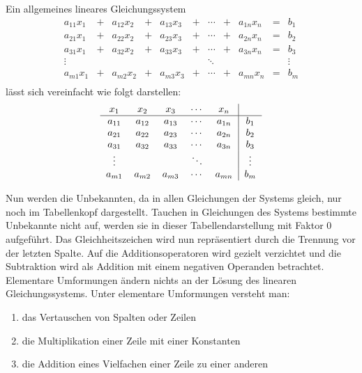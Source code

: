 			Ein allgemeines lineares Gleichungssystem
			\[
				\begin{array} {ccccccccccc}
					a_{11} x_1 & + & a_{12} x_2 & + & a_{13} x_3 & + & \cdots & + & a_{1n} x_n & = & b_1\\
					a_{21} x_1 & + & a_{22} x_2 & + & a_{23} x_3 & + & \cdots & + & a_{2n} x_n & = & b_2\\
					a_{31} x_1 & + & a_{32} x_2 & + & a_{33} x_3 & + & \cdots & + & a_{3n} x_n & = & b_3\\
					\vdots & & & & & & \ddots & & & & \vdots\\
					a_{m1} x_1 & + & a_{m2} x_2 & + & a_{m3} x_3 & + & \cdots & + & a_{mn} x_n & = & b_m\\
				\end{array}
			\]
			l\"asst sich vereinfacht wie folgt darstellen:
			\[
				\begin{tabular} {ccccc|c}
					$x_1$ & $x_2$ & $x_3$ & $\cdots$ & $x_n$ &\\
					\hline
					$a_{11}$ & $a_{12}$ & $a_{13}$ & $\cdots$ & $a_{1n}$ & $b_1$\\
					$a_{21}$ & $a_{22}$ & $a_{23}$ & $\cdots$ & $a_{2n}$ & $b_2$\\
					$a_{31}$ & $a_{32}$ & $a_{33}$ & $\cdots$ & $a_{3n}$ & $b_3$\\
					$\vdots$ & & & $\ddots$ & & $\vdots$\\
					$a_{m1}$ & $a_{m2}$ & $a_{m3}$ & $\cdots$ & $a_{mn}$ & $b_m$\\
				\end{tabular}
			\]
			
			\noindent Nun werden die Unbekannten,
			da in allen Gleichungen der Systems gleich,
			nur noch im Tabellenkopf dargestellt.
			Tauchen in Gleichungen des Systems bestimmte Unbekannte nicht auf,
			werden sie in dieser Tabellendarstellung mit Faktor 0 aufgef\"uhrt.
			Das Gleichheitszeichen wird nun repr\"asentiert durch die Trennung vor der letzten Spalte.
			Auf die Additionsoperatoren wird gezielt verzichtet und die Subtraktion wird als Addition mit einem negativen   	Operanden betrachtet.
            Elementare Umformungen \"andern nichts an der L\"osung des linearen Gleichungssystems.
			Unter elementare Umformungen versteht man:

			\begin{enumerate}
				\item das Vertauschen von Spalten oder Zeilen
				\item die Multiplikation einer Zeile mit einer Konstanten
				\item die Addition eines Vielfachen einer Zeile zu einer anderen
			\end{enumerate}
						
